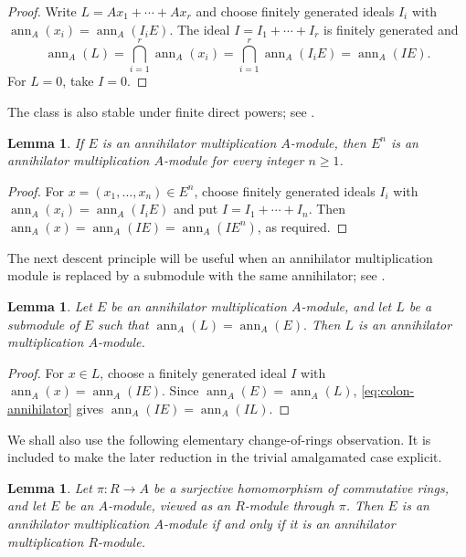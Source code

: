 \documentclass[11pt]{amsart}
\theoremstyle{plain}
\newtheorem{lemma}[theorem]{Lemma}
\theoremstyle{definition}
\theoremstyle{remark}
\newcommand{\ann}{\operatorname{ann}}
\numberwithin{equation}{section}
\begin{document}
\begin{proof}
Write $L=Ax_1+\cdots+Ax_r$ and choose finitely generated ideals $I_i$ with
$\ann_A(x_i)=\ann_A(I_iE)$. The ideal $I=I_1+\cdots+I_r$ is finitely
generated and
\[
\ann_A(L)=\bigcap_{i=1}^r\ann_A(x_i)
=\bigcap_{i=1}^r\ann_A(I_iE)=\ann_A(IE).
\]
For $L=0$, take $I=0$.
\end{proof}


The class is also stable under finite direct powers; see
\cite[Proposition~5]{KocAMM}.

\begin{lemma}
\label{lem:direct-powers}
If $E$ is an annihilator multiplication $A$-module, then $E^n$ is an
annihilator multiplication $A$-module for every integer $n\geq 1$.
\end{lemma}

\begin{proof}
For $x=(x_1,\ldots,x_n)\in E^n$, choose finitely generated ideals $I_i$ with
$\ann_A(x_i)=\ann_A(I_iE)$ and put $I=I_1+\cdots+I_n$.
Then $\ann_A(x)=\ann_A(IE)=\ann_A(I E^n)$, as required.
\end{proof}


The next descent principle will be useful when an annihilator multiplication
module is replaced by a submodule with the same annihilator; see
\cite[Corollary 2(ii)]{KocAMM}.

\begin{lemma}
\label{lem:equal-ann-submodule}
Let $E$ be an annihilator multiplication $A$-module, and let $L$ be a submodule
of $E$ such that $\ann_A(L)=\ann_A(E).$
Then $L$ is an annihilator multiplication $A$-module.
\end{lemma}

\begin{proof}
For $x\in L$, choose a finitely generated ideal $I$ with
$\ann_A(x)=\ann_A(IE)$. Since $\ann_A(E)=\ann_A(L)$,
\eqref{eq:colon-annihilator} gives $\ann_A(IE)=\ann_A(IL)$.
\end{proof}


We shall also use the following elementary change-of-rings observation. It is
included to make the later reduction in the trivial amalgamated case explicit.

\begin{lemma}
\label{lem:quotient-change}
Let $\pi:R\to A$ be a surjective homomorphism of commutative rings, and let $E$
be an $A$-module, viewed as an $R$-module through $\pi$. Then $E$ is an
annihilator multiplication $A$-module if and only if it is an annihilator
multiplication $R$-module.
\end{lemma}
\end{document}
